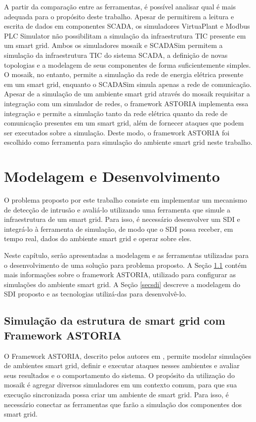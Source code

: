 \documentclass[cic,tc]{iiufrgs}
\begin{document}
A partir da comparação entre as ferramentas, é possível analisar qual é mais adequada para o propósito deste trabalho. Apesar de permitirem a leitura e escrita de dados em componentes SCADA, os simuladores VirtuaPlant e Modbus PLC Simulator não possibilitam a simulação da infraestrutura TIC presente em um smart grid. Ambos os simuladores mosaik e SCADASim permitem a simulação da infraestrutura TIC do sistema SCADA, a definição de novas topologias e a modelagem de seus componentes de forma suficientemente simples. O mosaik, no entanto, permite a simulação da rede de energia elétrica presente em um smart grid, enquanto o SCADASim simula apenas a rede de comunicação.
Apesar de a simulação de um ambiente smart grid através do mosaik requisitar a integração com um simulador de redes, o framework ASTORIA implementa essa integração e permite a simulação tanto da rede elétrica quanto da rede de comunicação presentes em um smart grid, além de fornecer ataques que podem ser executados sobre a simulação. Deste modo, o framework ASTORIA foi escolhido como ferramenta para simulação do ambiente smart grid neste trabalho.

\chapter{Modelagem e Desenvolvimento}
O problema proposto por este trabalho consiste em implementar um mecanismo de detecção de intrusão e avaliá-lo utilizando uma ferramenta que simule a infraestrutura de um smart grid. Para isso, é necessário desenvolver um SDI e integrá-lo à ferramenta de simulação, de modo que o SDI possa receber, em tempo real, dados do ambiente smart grid e operar sobre eles.
 
Neste capítulo, serão apresentadas a modelagem e as ferramentas utilizadas para o desenvolvimento de uma solução para problema proposto. A Seção \ref{secastoria} contém mais informações sobre o framework ASTORIA, utilizado para configurar as simulações do ambiente smart grid. A Seção \ref{secsdi} descreve a modelagem do SDI proposto e as tecnologias utilizá-das para desenvolvê-lo.
 
\section{Simulação da estrutura de smart grid com Framework ASTORIA}
\label{secastoria}
 
O Framework ASTORIA, descrito pelos autores em \cite{wermann2015astoria}, permite modelar simulações de ambientes smart grid, definir e executar ataques nesses ambientes e avaliar seus resultados e o comportamento do sistema.
O propósito da utilização do mosaik é agregar diversos simuladores em um contexto comum, para que sua execução sincronizada possa criar um ambiente de smart grid. Para isso, é necessário conectar as ferramentas que farão a simulação dos componentes dos smart grid.
 
\end{document}
